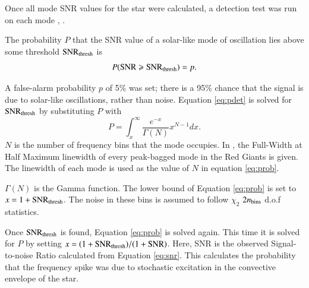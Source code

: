\documentclass[a4paper,fleqn,usenatbib,useAMS]{mnras}
\begin{document}
Once all mode SNR values for the star were calculated, a detection test was run on each mode \citep{chaplin_predicting_2011}, \citep{campante_asteroseismic_2016}.

The probability $P$ that the SNR value of a solar-like mode of oscillation lies above some threshold ${\rm SNR_{thresh}}$ is
\begin{equation}
\label{eq:pdet}
{P \rm ({ SNR \geq SNR_{thresh}})} =  p .
\end{equation}

A false-alarm probability $p$ of 5\% was set; there is a 95\% chance that the signal is due to solar-like oscillations, rather than noise. Equation \ref{eq:pdet} is solved for $\rm SNR_{thresh}$ by substituting $P$ with
\begin{equation}
\label{eq:prob}
P = \int_{x}^{\infty} \frac{e^{-x}}{\Gamma(N)} x^{N-1} dx .
\end{equation}
$N$ is the number of frequency bins that the mode occupies. In \citet{davies_asteroseismology_2016}, the Full-Width at Half Maximum linewidth of every peak-bagged mode in the Red Giants is given. The linewidth of each mode is used as the value of $N$ in equation \ref{eq:prob}.

$\Gamma(N)$ is the Gamma function. The lower bound of Equation \ref{eq:prob} is set to $x=1+{\rm SNR_{thresh}}$. The noise in these bins is assumed to follow $\chi_{2}$ $2n_{\rm bins}$ d.o.f statistics. 

Once $\rm SNR_{thresh}$ is found, Equation \ref{eq:prob} is solved again. This time it is solved for $P$ by setting $x=(1+{\rm SNR_{thresh}})/(1+{\rm SNR})$. Here, SNR is the observed Signal-to-noise Ratio calculated from Equation \ref{eq:snr}. This calculates the probability that the frequency spike was due to stochastic excitation in the convective envelope of the star.
\end{document}

